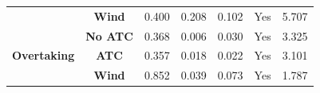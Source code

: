 \begin{table}
\begin{tabular}{ccccccc}
                                                                                                & \textbf{Wind}                   & 0.400                 & 0.208                 & 0.102                        & Yes                                                                                                   & 5.707                                                                                                    \\ 
\cline{2-7}
\multirow{3}{*}{\textbf{Overtaking}}                                                            & \textbf{No ATC}                 & 0.368            & 0.006            & 0.030                   & Yes                                                                                                & 3.325                                                                                               \\
                                                                                                & \textbf{ATC}                    & 0.357            & 0.018            & 0.022                   & Yes                                                                                                & 3.101                                                                                               \\
                                                                                                & \textbf{Wind}                   & 0.852            & 0.039            & 0.073                   & Yes                                                                                                & 1.787                                                                                               \\
\bottomrule
\end{tabular}
\end{table}

